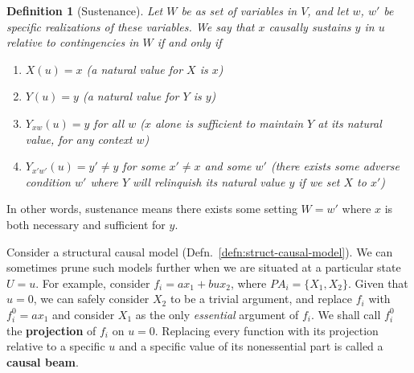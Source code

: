\documentclass[11pt]{article}
\numberwithin{equation}{section}
\newtheorem{defn}{Definition}[section]
\begin{document}
\begin{defn}[Sustenance]
Let $W$ be as set of variables in $V$, and let $w$, $w'$ be specific realizations of these variables. We say that $x$ causally sustains $y$ in $u$ relative to contingencies in $W$ if and only if
\begin{enumerate}[noitemsep]
\item $X(u)=x$ (a natural value for $X$ is $x$)
\item $Y(u)=y$ (a natural value for $Y$ is $y$)
\item $Y_{xw}(u)=y$ for all $w$ ($x$ alone is sufficient to maintain $Y$ at its natural value, for any context $w$)
\item $Y_{x'w'}(u)=y'\neq y$ for some $x'\neq x$ and some $w'$ (there exists some adverse condition $w'$ where $Y$ will relinquish its natural value $y$ if we set $X$ to $x'$)
\end{enumerate}
\end{defn}
\noindent In other words, sustenance means there exists some setting $W=w'$ where $x$ is both necessary and sufficient for $y$.

Consider a structural causal model (Defn.~\ref{defn:struct-causal-model}). We can sometimes prune such models further when we are situated at a particular state $U=u$. For example, consider $f_i=ax_1 + bux_2$, where $PA_i=\{X_1, X_2\}$. Given that $u=0$, we can safely consider $X_2$ to be a trivial argument, and replace $f_i$ with $f_i^0=ax_1$ and consider $X_1$ as the only \textit{essential} argument of $f_i$. We shall call $f_i^0$ the \textbf{projection} of $f_i$ on $u=0$. Replacing every function with its projection relative to a specific $u$ and a specific value of its nonessential part is called a \textbf{causal beam}.
\end{document}
